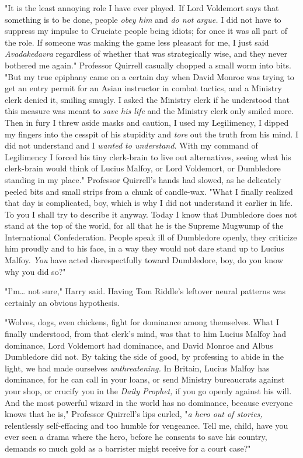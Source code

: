"It is the least annoying role I have ever played. If Lord Voldemort says that
something is to be done, people \emph{obey him} and \emph{do not argue.} I did
not have to suppress my impulse to Cruciate people being idiots; for once it
was all part of the role. If someone was making the game less pleasant for me,
I just said \emph{Avadakedavra} regardless of whether that was strategically
wise, and they never bothered me again." Professor Quirrell casually chopped a
small worm into bits. "But my true epiphany came on a certain day when David
Monroe was trying to get an entry permit for an Asian instructor in combat
tactics, and a Ministry clerk denied it, smiling smugly. I asked the Ministry
clerk if he understood that this measure was meant to \emph{save his life} and
the Ministry clerk only smiled more. Then in fury I threw aside masks and
caution, I used my Legilimency, I dipped my fingers into the cesspit of his
stupidity and \emph{tore} out the truth from his mind. I did not understand and
I \emph{wanted to understand.} With my command of Legilimency I forced his tiny
clerk-brain to live out alternatives, seeing what his clerk-brain would think
of Lucius Malfoy, or Lord Voldemort, or Dumbledore standing in my place."
Professor Quirrell's hands had slowed, as he delicately peeled bits and small
strips from a chunk of candle-wax. "What I finally realized that day is
complicated, boy, which is why I did not understand it earlier in life. To you
I shall try to describe it anyway. Today I know that Dumbledore does not stand
at the top of the world, for all that he is the Supreme Mugwump of the
International Confederation. People speak ill of Dumbledore openly, they
criticize him proudly and to his face, in a way they would not dare stand up to
Lucius Malfoy. \emph{You} have acted disrespectfully toward Dumbledore, boy, do
you know why you did so?"

"I'm{\ldots} not sure," Harry said. Having Tom Riddle's leftover neural
patterns was certainly an obvious hypothesis.

"Wolves, dogs, even chickens, fight for dominance among themselves. What I
finally understood, from that clerk's mind, was that to him Lucius Malfoy had
dominance, Lord Voldemort had dominance, and David Monroe and Albus Dumbledore
did not. By taking the side of good, by professing to abide in the light, we
had made ourselves \emph{unthreatening.} In Britain, Lucius Malfoy has
dominance, for he can call in your loans, or send Ministry bureaucrats against
your shop, or crucify you in the \emph{Daily Prophet,} if you go openly against
his will. And the most powerful wizard in the world has no dominance, because
everyone knows that he is," Professor Quirrell's lips curled, "\emph{a hero out
of stories,} relentlessly self-effacing and too humble for vengeance. Tell me,
child, have you ever seen a drama where the hero, before he consents to save
his country, demands so much gold as a barrister might receive for a court
case?"

